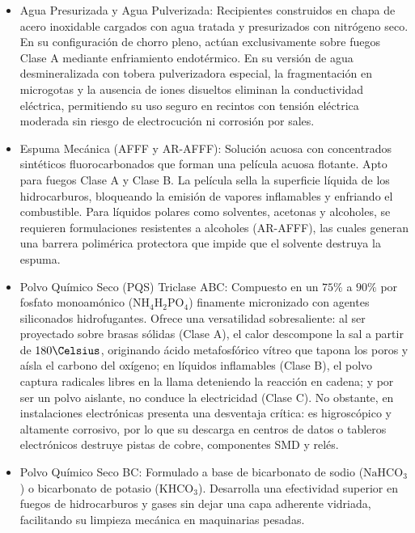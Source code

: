 \begin{itemize}
    \item Agua Presurizada y Agua Pulverizada: Recipientes construidos en chapa de acero inoxidable cargados con agua
          tratada y presurizados con nitrógeno seco. En su configuración de chorro pleno, actúan exclusivamente sobre fuegos
          Clase A mediante enfriamiento endotérmico. En su versión de agua desmineralizada con tobera pulverizadora especial,
          la fragmentación en microgotas y la ausencia de iones disueltos eliminan la conductividad eléctrica, permitiendo
          su uso seguro en recintos con tensión eléctrica moderada sin riesgo de electrocución ni corrosión por sales.
    \item Espuma Mecánica (AFFF y AR-AFFF): Solución acuosa con concentrados sintéticos fluorocarbonados que forman una
          película acuosa flotante. Apto para fuegos Clase A y Clase B. La película
          sella la superficie líquida de los hidrocarburos, bloqueando la emisión de vapores inflamables y enfriando el
          combustible. Para líquidos polares como solventes, acetonas y alcoholes, se requieren formulaciones resistentes a
          alcoholes (AR-AFFF), las cuales generan una barrera polimérica protectora que impide que el solvente destruya la
          espuma.
    \item Polvo Químico Seco (PQS) Triclase ABC: Compuesto en un $75\percent$ a $90\percent$ por fosfato monoamónico
          ($\mathrm{NH_4H_2PO_4}$) finamente micronizado con agentes siliconados hidrofugantes. Ofrece una versatilidad
          sobresaliente: al ser proyectado sobre brasas sólidas (Clase A), el calor descompone la sal a partir de
          $180\Celsius$, originando ácido metafosfórico vítreo que tapona los poros y aísla el carbono del oxígeno; en
          líquidos inflamables (Clase B), el polvo captura radicales libres en la llama deteniendo la reacción en cadena; y
          por ser un polvo aislante, no conduce la electricidad (Clase C). No obstante, en instalaciones electrónicas
          presenta una desventaja crítica: es higroscópico y altamente corrosivo, por lo que su descarga en centros de datos
          o tableros electrónicos destruye pistas de cobre, componentes SMD y relés.
    \item Polvo Químico Seco BC: Formulado a base de bicarbonato de sodio ($\mathrm{NaHCO_3}$) o bicarbonato de potasio
          ($\mathrm{KHCO_3}$). Desarrolla una efectividad superior en fuegos de hidrocarburos y gases sin
          dejar una capa adherente vidriada, facilitando su limpieza mecánica en maquinarias pesadas.

\end{itemize}
